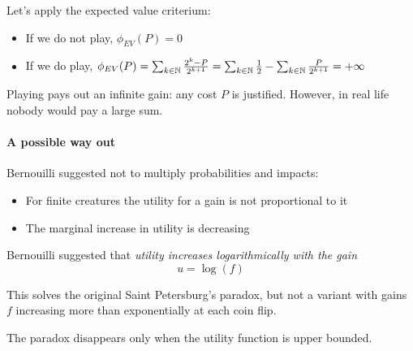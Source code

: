 Let's apply the expected value criterium:
\begin{itemize}
	\item If we do not play, $\phi_{EV} (P) = 0$
	
	\item If we do play, $\phi_{EV} (P) = \sum_{k \in \operatorname{\mathbb{N}}} \frac{2^k - P}{2^{k+1}} = \sum_{k \in \operatorname{\mathbb{N}}} \frac{1}{2} - \sum_{k \in \operatorname{\mathbb{N}}} \frac{P}{2^{k+1}} = + \infty$
\end{itemize}

Playing pays out an infinite gain: any cost $P$ is justified. However, in real life nobody would pay a large sum.

\paragraph{A possible way out} Bernouilli suggested not to multiply probabilities and impacts: 
\begin{itemize}
	\item For finite creatures the utility for a gain is not proportional to it
	
	\item The marginal increase in utility is decreasing
\end{itemize}

Bernouilli suggested that \textit{utility increases logarithmically with the gain}
$$ u = \log (f) $$

This solves the original Saint Petersburg's paradox, but not a variant with gains $f$ increasing more than exponentially at each coin flip.

The paradox disappears only when the utility function is upper bounded.

